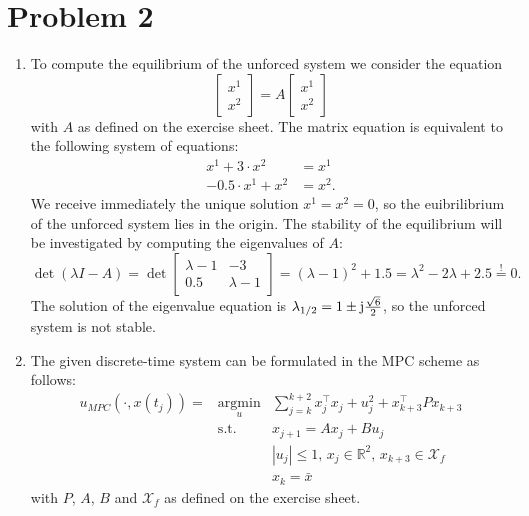 \documentclass[12pt,pdftex,a4paper]{scrartcl}
\DeclareMathOperator*{\argmin}{argmin}
\begin{document}
\section*{Problem 2}
\begin{enumerate}
    \item To compute the equilibrium of the unforced system we consider the equation
    \begin{equation*}
         \begin{bmatrix}
             x^1 \\ x^2
         \end{bmatrix}
         = A
         \begin{bmatrix}
             x^1 \\ x^2
         \end{bmatrix}
    \end{equation*}
    with $A$ as defined on the exercise sheet. The matrix equation is equivalent to the following system of equations:
    \begin{align*}
         x^1 + 3 \cdot x^2 &= x^1 \\
         -0.5 \cdot x^1 +x^2 &= x^2.
    \end{align*}
    We receive immediately the unique solution $x^1 = x^2 = 0$, so the euibrilibrium of the unforced system lies in the origin. The stability of the equilibrium will be investigated by computing the eigenvalues of $A$:
    \begin{equation*}         
         \det (\lambda I - A) = \det
         \begin{bmatrix}
            \lambda -1 & -3 \\
            0.5 & \lambda -1
         \end{bmatrix}
         = (\lambda -1)^2 +1.5 = \lambda^2 -2 \lambda +2.5 \overset{!}{=} 0.
    \end{equation*}
    The solution of the eigenvalue equation is $\lambda_{1/2} = 1 \pm \im \frac{\sqrt{6}}{2}$, so the unforced system is not stable.
    
    \item The given discrete-time system can be formulated in the MPC scheme as follows:
    \begin{equation} 
    \begin{array}{rcl} 
    u_{MPC} (\cdot , x(t_j)) = &\argmin\limits_u& \sum\limits_{j=k}^{k+2} x_j^\top x_j + u_j^2 +x_{k+3}^\top P x_{k+3} \\ 
    &\mathrm{s.t.}& x_{j+1} = A x_j + B u_j \\ 
    & & |u_j| \leq 1,\, x_j \in \mathbb{R}^2,\, x_{k+3} \in \mathcal{X}_f \\
    & & x_k = \bar{x}
    \end{array}      
    \end{equation}
    with $P$, $A$, $B$ and $\mathcal{X}_f$ as defined on the exercise sheet.
    

\end{enumerate}
\end{document}

